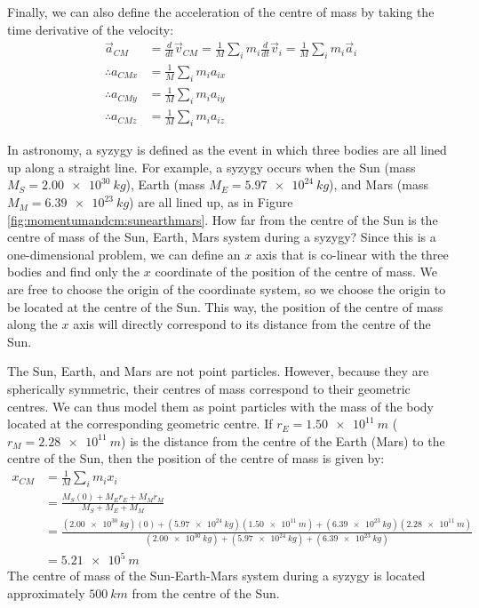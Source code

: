 Finally, we can also define the acceleration of the centre of mass by taking the time derivative of the velocity:
\begin{align}
\vec a_{CM} &= \frac{d}{dt}\vec v_{CM} = \frac{1}{M}\sum_i m_i\frac{d}{dt}\vec v_i=  \frac{1}{M}\sum_i m_i\vec a_i\nonumber\\
\therefore a_{CMx} &= \frac{1}{M}\sum_i m_i a_{ix}\nonumber\\
\therefore a_{CMy} &= \frac{1}{M}\sum_i m_i a_{iy}\nonumber\\
\therefore a_{CMz} &= \frac{1}{M}\sum_i m_i a_{iz}
\end{align}

\begin{example}{
In astronomy, a syzygy is defined as the event in which three bodies are all lined up along a straight line. For example, a syzygy occurs when the Sun (mass $M_S=\SI{2.00e30}{kg}$), Earth (mass $M_E=\SI{5.97e24}{kg}$), and Mars (mass $M_M=\SI{6.39e23}{kg}$) are all lined up, as in Figure \ref{fig:momentumandcm:sunearthmars}. How far from the centre of the Sun is the centre of mass of the Sun, Earth, Mars system during a syzygy?}
Since this is a one-dimensional problem, we can define an $x$ axis that is co-linear with the three bodies and find only the $x$ coordinate of the position of the centre of mass. We are free to choose the origin of the coordinate system, so we choose the origin to be located at the centre of the Sun. This way, the position of the centre of mass along the $x$ axis will directly correspond to its distance from the centre of the Sun.

The Sun, Earth, and Mars are not point particles. However, because they are spherically symmetric, their centres of mass correspond to their geometric centres. We can thus model them as point particles with the mass of the body located at the corresponding geometric centre. If $r_E=\SI{1.50e11}{m}$ ($r_M=\SI{2.28e11}{m}$) is the distance from the centre of the Earth (Mars) to the centre of the Sun, then the position of the centre of mass is given by:
\begin{align*}
x_{CM} &= \frac{1}{M}\sum_i m_i x_i\\
&=\frac{M_S(0)+M_Er_E+M_Mr_M}{M_S+M_E+M_M}\\
&=\frac{(\SI{2.00e30}{kg})(0)+(\SI{5.97e24}{kg})(\SI{1.50e11}{m})+(\SI{6.39e23}{kg})(\SI{2.28e11}{m})}{(\SI{2.00e30}{kg})+(\SI{5.97e24}{kg})+(\SI{6.39e23}{kg})}\\
&=\SI{5.21e5}{m}
\end{align*}
The centre of mass of the Sun-Earth-Mars system during a syzygy is located approximately $\SI{500}{km}$ from the centre of the Sun.


\end{example}
